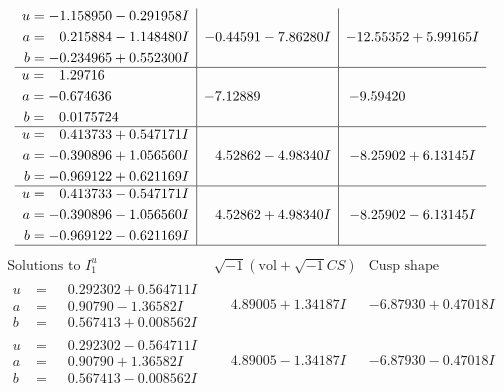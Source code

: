 \documentclass[1p]{elsarticle_modified}
\theoremstyle{definition}
\newcommand{\I}{\sqrt{-1}}
\begin{document}
$$\begin{array}{c|c|c}
\begin{aligned}
u &= -1.158950 - 0.291958 I \\
a &= \phantom{-}0.215884 - 1.148480 I \\
b &= -0.234965 + 0.552300 I\end{aligned}
 & -0.44591 - 7.86280 I & -12.55352 + 5.99165 I \\ \hline\begin{aligned}
u &= \phantom{-}1.29716\phantom{ +0.000000I} \\
a &= -0.674636\phantom{ +0.000000I} \\
b &= \phantom{-}0.0175724\phantom{ +0.000000I}\end{aligned}
 & -7.12889\phantom{ +0.000000I} & -9.59420\phantom{ +0.000000I} \\ \hline\begin{aligned}
u &= \phantom{-}0.413733 + 0.547171 I \\
a &= -0.390896 + 1.056560 I \\
b &= -0.969122 + 0.621169 I\end{aligned}
 & \phantom{-}4.52862 - 4.98340 I & -8.25902 + 6.13145 I \\ \hline\begin{aligned}
u &= \phantom{-}0.413733 - 0.547171 I \\
a &= -0.390896 - 1.056560 I \\
b &= -0.969122 - 0.621169 I\end{aligned}
 & \phantom{-}4.52862 + 4.98340 I & -8.25902 - 6.13145 I\\
 \hline 
 \end{array}$$\newpage$$\begin{array}{c|c|c}  
\text{Solutions to }I^u_{1}& \I (\text{vol} + \sqrt{-1}CS) & \text{Cusp shape}\\
 \hline 
\begin{aligned}
u &= \phantom{-}0.292302 + 0.564711 I \\
a &= \phantom{-}0.90790 - 1.36582 I \\
b &= \phantom{-}0.567413 + 0.008562 I\end{aligned}
 & \phantom{-}4.89005 + 1.34187 I & -6.87930 + 0.47018 I \\ \hline\begin{aligned}
u &= \phantom{-}0.292302 - 0.564711 I \\
a &= \phantom{-}0.90790 + 1.36582 I \\
b &= \phantom{-}0.567413 - 0.008562 I\end{aligned}
 & \phantom{-}4.89005 - 1.34187 I & -6.87930 - 0.47018 I \\ \hline\begin{aligned}

\end{aligned}
\end{array}$$
\end{document}
